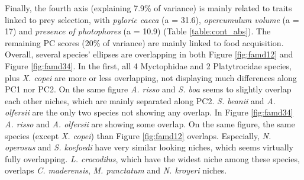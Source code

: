 Finally, the fourth axis (explaining 7.9\% of variance) is mainly related to traits linked to prey selection, with \emph{pyloric caeca} (a = 31.6), \emph{opercumulum volume} (a = 17) and \emph{presence of photophores} (a = 10.9) (Table \ref{table:cont_abs}). The remaining PC scores (20\% of variance) are mainly linked to food acquisition. 
Overall, several species' ellipses are overlapping in both Figure \ref{fig:famd12} and Figure \ref{fig:famd34}. In the first, all 4 Myctophidae and 2 Platytrocidae species, plus \textit{X. copei} are more or less overlapping, not displaying much differences along PC1 nor PC2. On the same figure \textit{A. risso} and \textit{S. boa} seems to slightly overlap each other niches, which are mainly separated along PC2. \textit{S. beanii} and \textit{A. olfersii} are the only two species not showing any overlap. 
In Figure \ref{fig:famd34} \textit{A. risso} and \textit{A. olfersii} are showing some overlap. On the same figure, the same species (except \textit{X. copei}) than Figure \ref{fig:famd12} overlaps. Especially, \textit{N. operosus} and \textit{S. koefoedi} have very similar looking niches, which seems virtually fully overlapping. \textit{L. crocodilus}, which have the widest niche among these species, overlaps \textit{C. maderensis}, \textit{M. punctatum} and \textit{N. kroyeri} niches. 


